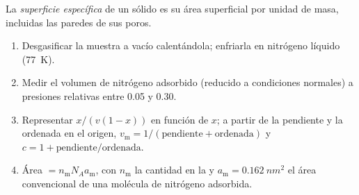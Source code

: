 \begin{definition}\label{def:b3:surfaces-catalysis:surface-area}
La \emph{superficie específica} de un sólido es su
área superficial por unidad de masa, incluidas las paredes de sus poros.
\end{definition}

\begin{method}\label{met:b3:surfaces-catalysis:bet-area}
\begin{enumerate}
  \item Desgasificar la muestra a vacío calentándola; enfriarla en nitrógeno líquido
        (\qty{77}{K}).
  \item Medir el volumen de nitrógeno adsorbido (reducido a condiciones normales)
        a presiones relativas entre 0.05 y 0.30.
  \item Representar $x/(v(1 - x))$ en función de $x$; a partir de la pendiente y la ordenada en el origen,
        $v_{\mathrm m} = 1/(\text{pendiente} + \text{ordenada})$ y $c = 1 + \text{pendiente}/\text{ordenada}$.
  \item Área $= n_{\mathrm m}N_Aa_{\mathrm m}$, con $n_{\mathrm m}$ la cantidad en la  y $a_{\mathrm m} = \qty{0.162}{nm^2}$
        el área convencional de una molécula de nitrógeno adsorbida.
\end{enumerate}
\end{method}

